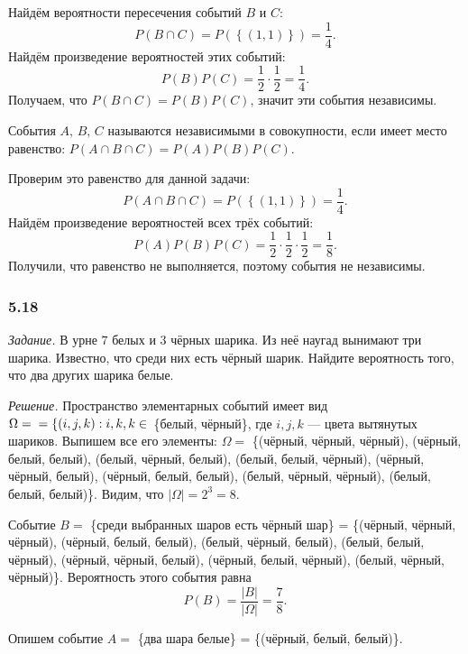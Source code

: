Найдём вероятности пересечения событий $B$ и $C$:
$$P \left( B \cap C \right) =
P \left( \left\{ \left( 1, 1 \right) \right\} \right) =
\frac{1}{4}.$$
Найдём произведение вероятностей этих событий:
$$P \left( B \right) P \left( C \right) =
\frac{1}{2} \cdot \frac{1}{2} =
\frac{1}{4}.$$
Получаем, что $P \left( B \cap C \right) = P \left( B \right) P \left( C \right) $, значит эти события независимы.

События $A, \, B, \, C$ называются независимыми в совокупности, если имеет место равенство:
$P \left( A \cap B \cap C \right) =
P \left( A \right) P \left( B \right) P \left( C \right) $.

Проверим это равенство для данной задачи:
$$P \left( A \cap B \cap C \right) =
P \left( \left\{ \left( 1, 1 \right) \right\} \right) =
\frac{1}{4}.$$
Найдём произведение вероятностей всех трёх событий:
$$P \left( A \right) P \left( B \right) P \left( C \right) =
\frac{1}{2} \cdot \frac{1}{2} \cdot \frac{1} {2} =
\frac{1}{8}.$$
Получили, что равенство не выполняется, поэтому события не независимы.

\subsubsection*{5.18}

\textit{Задание.} В урне $7$ белых и $3$ чёрных шарика.
Из неё наугад вынимают три шарика.
Известно, что среди них есть чёрный шарик.
Найдите вероятность того, что два других шарика белые.

\textit{Решение.}
Пространство элементарных событий имеет вид
$ \Omega = \\ = \left\{ \left( i, j, k \right): i, k, k \in \right.$ \{белый, чёрный\}, где $i, j, k$ --- цвета вытянутых шариков.
Выпишем все его элементы: $ \Omega = $ \{(чёрный, чёрный, чёрный), (чёрный, белый, белый), (белый, чёрный, белый), (белый, белый, чёрный),
(чёрный, чёрный, белый), (чёрный, белый, белый), (белый, чёрный, чёрный), (белый, белый, белый)\}.
Видим, что $ \left| \Omega \right| = 2^3 = 8$.

Событие $B =$ \{среди выбранных шаров есть чёрный шар\} = \{(чёрный, чёрный, чёрный),
(чёрный, белый, белый), (белый, чёрный, белый), (белый, белый, чёрный),
(чёрный, чёрный, белый), (чёрный, белый, чёрный), (белый, чёрный, чёрный)\}.
Вероятность этого события равна
$$P \left( B \right) =
\frac{ \left| B \right| }{ \left| \Omega \right| } =
\frac{7}{8}.$$

Опишем событие $A =$ \{два шара белые\} = \{(чёрный, белый, белый)\}.

